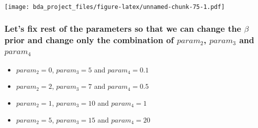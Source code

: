\documentclass[
]{article}
\providecommand{\tightlist}{%
  \setlength{\itemsep}{0pt}\setlength{\parskip}{0pt}}
\begin{document}
\texttt{[image: bda\_project\_files/figure-latex/unnamed-chunk-75-1.pdf]}

\hypertarget{lets-fix-rest-of-the-parameters-so-that-we-can-change-the-beta-prior-and-change-only-the-combination-of-param_2-param_3-and-param_4}{%
\subsubsection{\texorpdfstring{Let's fix rest of the parameters so that
we can change the \(\beta\) prior and change only the combination of
\(param_2\), \(param_3\) and
\(param_4\)}{Let's fix rest of the parameters so that we can change the \textbackslash beta prior and change only the combination of param\_2, param\_3 and param\_4}}\label{lets-fix-rest-of-the-parameters-so-that-we-can-change-the-beta-prior-and-change-only-the-combination-of-param_2-param_3-and-param_4}}

\begin{itemize}
\tightlist
\item
  \(param_2 = 0\), \(param_3 = 5\) and \(param_4 = 0.1\)
\item
  \(param_2 = 2\), \(param_3 = 7\) and \(param_4 = 0.5\)
\item
  \(param_2 = 1\), \(param_3 = 10\) and \(param_4 = 1\)
\item
  \(param_2 = 5\), \(param_3 = 15\) and \(param_4 = 20\)
\end{itemize}
\end{document}

